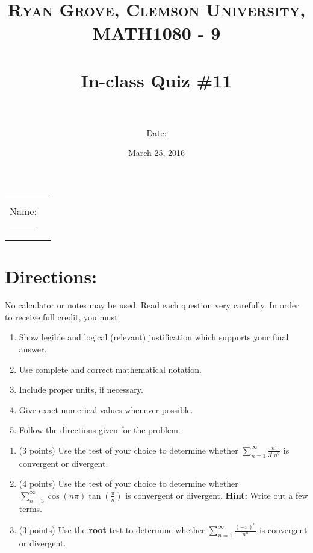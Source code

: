 \documentclass[paper=a4, fontsize=11pt]{scrartcl} %
\title{	
\normalfont \normalsize 
\textsc{Ryan Grove, Clemson University, MATH1080 - 9} \\ [25pt] %
\horrule{0.5pt} \\[0.4cm] %
\huge In-class Quiz \#11 \\ %
\horrule{2pt} \\[0.5cm] %
}
\author{Date:} %
\date{\normalsize March 25, 2016} %
\numberwithin{equation}{section} %
\numberwithin{figure}{section} %
\numberwithin{table}{section} %
\begin{document}
\maketitle %

\begin{flushleft}
\begin{tabular}{l l}
Name: \rule{3.2in}{.01cm}  & {}%
\end{tabular}
\end{flushleft}


\section*{\textbf{Directions:}}

No calculator or notes may be used.  Read each question very carefully.  In order to receive full credit, you must:
\begin{enumerate}
\item Show legible and logical (relevant) justification which supports your final answer.
\item Use complete and correct mathematical notation.
\item Include proper units, if necessary.
\item Give exact numerical values whenever possible.
\item Follow the directions given for the problem.
\end{enumerate}
\vspace{.1in}

\newpage

\begin{enumerate}
\item (3 points) Use the test of your choice to determine whether 
$\sum\limits_{n=1}^\infty \frac{n!}{3^n n^2}$ is convergent or divergent.

\newpage

\item (4 points) Use the test of your choice to determine whether 
$\sum\limits_{n=3}^\infty \cos (n \pi) \tan (\frac{\pi}{n})$ is convergent or divergent. \textbf{Hint:} Write out a few terms.

\newpage

\item (3 points) Use the \textbf{root} test to determine whether 
$\sum\limits_{n=1}^\infty \frac{(-\pi)^n}{n^n}$ is convergent or divergent. 



\end{enumerate}

\end{document}
